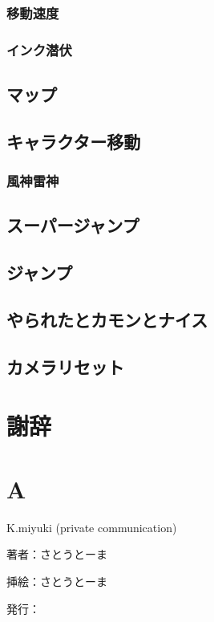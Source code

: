 \documentclass[a4paper,11pt]{jsbook}
\begin{document}
\subsection{移動速度}
\subsection{インク潜伏}
\section{マップ}
\section{キャラクター移動}
\subsection{風神雷神}
\section{スーパージャンプ}
\section{ジャンプ}
\section{やられたとカモンとナイス}
\section{カメラリセット}


\chapter{謝辞}

\appendix
\chapter{A}



\begin{thebibliography}{2}

K.miyuki (private communication)
\end{thebibliography}

\thispagestyle{empty}
\begin{flushright}
\begin{minipage}{0.5\hsize}
\begin{description}
  \item{著者：}さとうとーま
  \item{挿絵：}さとうとーま
  \item{発行：}\date{\today}
\end{description}
\end{minipage}
\end{flushright}
\end{document}
